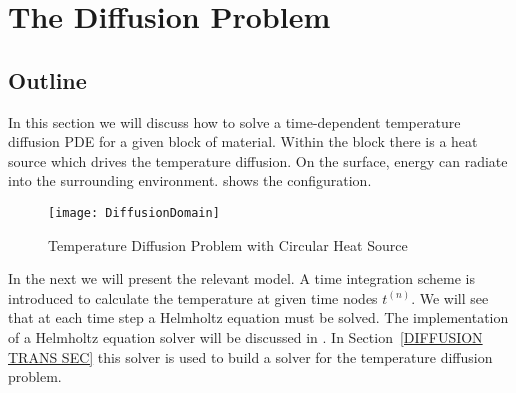 
%
%
%

\section{The Diffusion Problem}
\label{DIFFUSION CHAP}

\subsection{\label{DIFFUSION OUT SEC}Outline}
In this section we will discuss how to solve a time-dependent temperature
diffusion PDE for a given block of material.
Within the block there is a heat source which drives the temperature diffusion.
On the surface, energy can radiate into the surrounding environment.
 shows the configuration.

\begin{figure}
\centerline{\texttt{[image: DiffusionDomain]}}
\caption{Temperature Diffusion Problem with Circular Heat Source}
\label{DIFFUSION FIG 1}
\end{figure}

In the next  we will present the relevant model.
A time integration scheme is introduced to calculate the temperature at given time nodes $t^{(n)}$.
We will see that at each time step a Helmholtz equation must be solved. 
The implementation of a Helmholtz equation solver will be discussed in . 
In Section~\ref{DIFFUSION TRANS SEC} this solver is used to build a solver for
the temperature diffusion problem.

